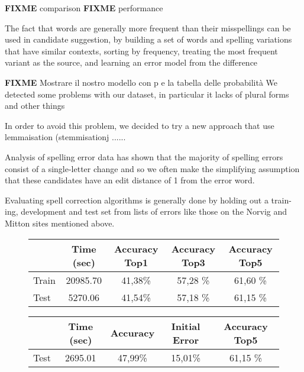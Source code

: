 \textbf{FIXME} comparison
\textbf{FIXME} performance

The fact that words are generally more frequent than their misspellings can be used in candidate suggestion, by 
building a set of words and spelling variations that have similar contexts, sorting by frequency, treating the most 
frequent variant as the source, and learning an error model from the difference


\textbf{FIXME} Mostrare il nostro modello con p e la tabella delle probabilità
We detected some problems with our dataset, in particular it lacks of plural forms and other things

In order to avoid this problem, we decided to try a new approach that use lemmaisation (stemmisationj ......



Analysis of spelling error data has shown that the majority of spelling errors consist of a single-letter change and 
so we 
often make the simplifying assumption that these candidates have an edit distance of 1 from the error word.



Evaluating spell correction algorithms is generally done by holding out a train- ing, development and test set from 
lists of errors like those on the Norvig and Mitton sites mentioned above.

\begin{figure}[H]
	\centering
	\begin{tabular}{lcccc}
		\toprule
		 & Time (sec)  & Accuracy Top1 & Accuracy Top3  &  Accuracy Top5 \\
		\midrule
		Train & \num{20985,70} & 41,38\%  & 57,28 \% & 61,60 \%  \\
		Test &	\num{5270,06}  & 41,54\%  & 57,18 \% & 61,15 \%  \\
		\bottomrule
	\end{tabular}
	\label{tab:typo-eval}
\end{figure}


\begin{figure}[H]
	\centering
	\begin{tabular}{lcccc}
		\toprule
		& Time (sec)  & Accuracy & Initial Error  &  Accuracy Top5 \\
		\midrule
		Test &	\num{2695,01}  & 47,99\%  & 15,01\% & 61,15 \%  \\
		\bottomrule
	\end{tabular}
	\label{tab:sentence-eval}
\end{figure}